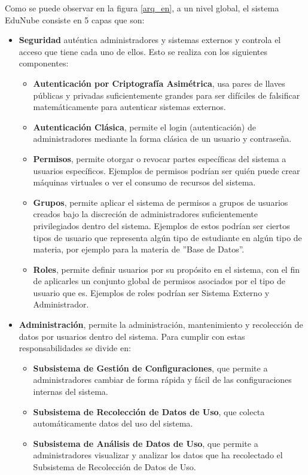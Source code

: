Como se puede observar en la figura \ref{arq_en}, a un nivel global, el sistema EduNube consiste en 5 capas que son:
\begin{itemize}
	\item \textbf{Seguridad} auténtica administradores y sistemas externos y controla el acceso que tiene cada uno de ellos. Esto se realiza con los siguientes componentes:
    \begin{itemize}
    	\item \textbf{Autenticación por Criptografía Asimétrica}, usa pares de llaves públicas y privadas suficientemente grandes para ser difíciles de falsificar matemáticamente para autenticar sistemas externos.
    	\item \textbf{Autenticación Clásica}, permite el login (autenticación) de administradores mediante la forma clásica de un usuario y contraseña.
    	\item \textbf{Permisos}, permite otorgar o revocar partes específicas del sistema a usuarios específicos. Ejemplos de permisos podrían ser quién puede crear máquinas virtuales o ver el consumo de recursos del sistema.
    	\item \textbf{Grupos}, permite aplicar el sistema de permisos a grupos de usuarios creados bajo la discreción de administradores suficientemente privilegiados dentro del sistema. Ejemplos de estos podrían ser ciertos tipos de usuario que representa algún tipo de estudiante en algún tipo de materia, por ejemplo para la materia de ''Base de Datos''.
    	\item \textbf{Roles}, permite definir usuarios por su propósito en el sistema, con el fin de aplicarles un conjunto global de permisos asociados por el tipo de usuario que es. Ejemplos de roles podrían ser Sistema Externo y Administrador.
    \end{itemize}
	\item \textbf{Administración}, permite la administración, mantenimiento y recolección de datos por usuarios dentro del sistema. Para cumplir con estas responsabilidades se divide en:
    \begin{itemize}
    	\item \textbf{Subsistema de Gestión de Configuraciones}, que permite a administradores cambiar de forma rápida y fácil de las configuraciones internas del sistema.
    	\item \textbf{Subsistema de Recolección de Datos de Uso}, que colecta automáticamente datos del uso del sistema.
    	\item \textbf{Subsistema de Análisis de Datos de Uso}, que permite a administradores visualizar y analizar los datos que ha recolectado el Subsistema de Recolección de Datos de Uso.

\end{itemize}
\end{itemize}

